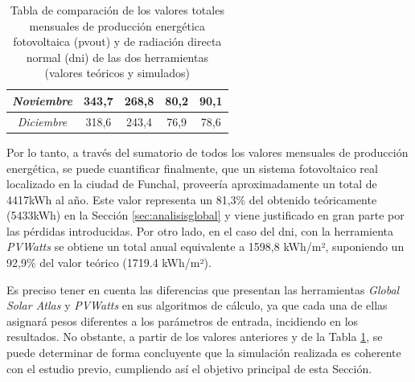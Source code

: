 \begin{table}
\begin{tabularx}{\textheight}{|c|XX|XX|}
        \textit{Noviembre} & \multicolumn{1}{c|}{343,7} & \multicolumn{1}{c|}{268,8} & \multicolumn{1}{c|}{80,2} & \multicolumn{1}{c|}{90,1} \\ \hline
        \textit{Diciembre} & \multicolumn{1}{c|}{318,6} & \multicolumn{1}{c|}{243,4} & \multicolumn{1}{c|}{76,9} & \multicolumn{1}{c|}{78,6} \\ \hline
    \end{tabularx}
    \caption{Tabla de comparación de los valores totales mensuales de producción energética fotovoltaica (\acrshort{pvout}) y de radiación directa normal (\acrshort{dni}) de las dos herramientas (valores teóricos y simulados)}
    \label{tab:globalvspvwatts}
\end{table}


\vspace{3mm}

Por lo tanto, a través del sumatorio de todos los valores mensuales de producción energética, se puede cuantificar finalmente, que un sistema fotovoltaico real localizado en la ciudad de Funchal, proveería aproximadamente un total de 4417kWh al año. Este valor representa un 81,3\% del obtenido teóricamente (5433kWh) en la Sección \ref{sec:analisisglobal} y viene justificado en gran parte por las pérdidas introducidas. Por otro lado, en el caso del \gls{dni}, con la herramienta \textit{PVWatts} se obtiene un total anual equivalente a 1598,8 kWh/m², suponiendo un 92,9\% del valor teórico (1719.4 kWh/m²).

\vspace{3mm}

Es preciso tener en cuenta las diferencias que presentan las herramientas \textit{Global Solar Atlas} y \textit{PVWatts} en sus algoritmos de cálculo, ya que cada una de ellas asignará pesos diferentes a los parámetros de entrada, incidiendo en los resultados. No obstante, a partir de los valores anteriores y de la Tabla \ref{tab:globalvspvwatts}, se puede determinar de forma concluyente que la simulación realizada es coherente con el estudio previo, cumpliendo así el objetivo principal de esta Sección.

\clearpage